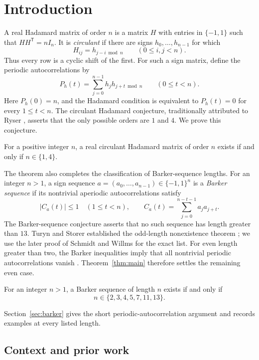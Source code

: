 \section{Introduction}

A real Hadamard matrix of order \(n\) is a matrix \(H\) with entries
in \(\{-1,1\}\) such that \(HH^{\mathsf T}=nI_n\). It is
\emph{circulant} if there are signs \(h_0,\ldots,h_{n-1}\) for which
\[
 H_{ij}=h_{j-i\bmod n}\qquad(0\leq i,j<n).
\]
Thus every row is a cyclic shift of the first. For such a sign matrix,
define the periodic autocorrelations by
\[
 P_h(t)=\sum_{j=0}^{n-1}h_jh_{j+t\bmod n}
 \qquad(0\leq t<n).
\]
Here \(P_h(0)=n\), and the Hadamard condition is equivalent to
\(P_h(t)=0\) for every \(1\leq t<n\).
The circulant Hadamard conjecture, traditionally attributed to Ryser
\cite{Ryser1963,LeungSchmidt2012}, asserts that the only possible
orders are \(1\) and \(4\). We prove this conjecture.

\begin{theorem}\label{thm:main}
For a positive integer \(n\), a real circulant Hadamard matrix of
order \(n\) exists if and only if \(n\in\{1,4\}\).
\end{theorem}

The theorem also completes the classification of Barker-sequence
lengths. For an integer \(n>1\), a sign sequence
\(a=(a_0,\ldots,a_{n-1})\in\{-1,1\}^n\) is a \emph{Barker sequence}
if its nontrivial aperiodic autocorrelations satisfy
\[
 |C_a(t)|\leq1\quad(1\leq t<n),\qquad
 C_a(t)=\sum_{j=0}^{n-t-1}a_ja_{j+t}.
\]
The Barker-sequence conjecture asserts that no such sequence has
length greater than \(13\). Turyn and Storer established the odd-length
nonexistence theorem \cite{TurynStorer1961}; we use the later proof of
Schmidt and Willms \cite{SchmidtWillms2016} for the exact list.
For even length greater
than two, the Barker inequalities imply that all nontrivial periodic
autocorrelations vanish \cite{TurynStorer1961,Turyn1965}.
Theorem~\ref{thm:main} therefore settles the remaining even case.

\begin{corollary}\label{cor:barker}
For an integer \(n>1\), a Barker sequence of length \(n\) exists if
and only if
\[
 n\in\{2,3,4,5,7,11,13\}.
\]
\end{corollary}

Section~\ref{sec:barker} gives the short periodic-autocorrelation
argument and records examples at every listed length.

\subsection*{Context and prior work}

